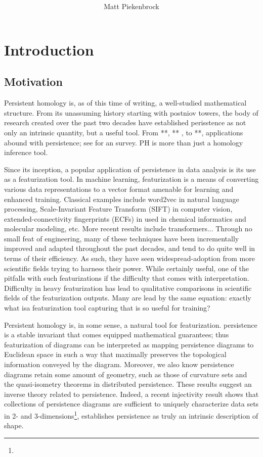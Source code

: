 \documentclass[10pt]{article}
\title{\vspace{-2.0em} \vspace{-0.5em}}
\author{Matt Piekenbrock}
\date{}
\newcommand{\+}{%
	\raisebox{0.18ex}{\scaleobj{0.55}{+}}
}
\begin{document}
\noindent



\section{Introduction}
\subsection*{Motivation}
Persistent homology is, as of this time of writing, a well-studied mathematical structure. From its unassuming history starting with postniov towers, the body of research created over the past two decades have established perisstence as not only an intrinsic quantity, but a useful tool. 
From **, ** , to **, applications abound with persistence; see for an survey. PH is more than just a homology inference tool.  

Since its inception, a popular application of persistence in data analysis is its use as a featurization tool. 
In machine learning, featurization is a means of converting various data representations to a vector format amenable for learning and enhanced training. Classical examples include word2vec in natural language processing, Scale-Invariant Feature Transform (SIFT) in computer vision, extended-connectivity fingerprints (ECFs) in used in chemical informatics and molecular modeling, etc. 
More recent results include transformers... 
Through no small feat of engineering, many of these techniques have been incrementally improved and adapted throughout the past decades, and tend to do quite well in terms of their efficiency. As such, they have seen widespread-adoption from more scientific fields trying to harness their power. 
While certainly useful, one of the pitfalls with such featurizations if the difficulty that comes with interpretation. 
Difficulty in heavy featurization has lead to qualitative comparisons in scientific fields of the featurization outputs. Many are lead by the same equation: exactly what isa featurization tool capturing that is so useful for training?

Persistent homology is, in some sense, a natural tool for featurization. persistence is a stable invariant that comes equipped mathematical guarantees; thus featurization of diagrams can be interpreted as mapping persistence diagrams to Euclidean space in such a way that maximally preserves the topological information conveyed by the diagram. 
Moreover, we also know persistence diagrams retain some amount of geometry, such as those of curvature sets and the quasi-isometry theorems in distributed persistence. These results suggest an inverse theory related to persistence. 
Indeed, a recent injectivity result shows that collections of persistence diagrams are sufficient to uniquely characterize data sets in 2- and 3-dimensions\footnote{}, establishes persistence as truly an intrinsic description of shape. 
\end{document}

